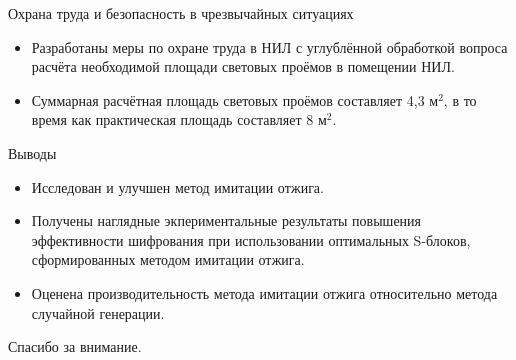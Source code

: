 \documentclass[12pt,unicode]{beamer}
\begin{document}
\begin{frame}{Охрана труда и безопасность в чрезвычайных ситуациях}

    \begin{itemize}

        \item Разработаны меры по охране труда в НИЛ с углублённой обработкой вопроса расчёта необходимой площади световых проёмов в помещении НИЛ.
        
        \item Суммарная расчётная площадь световых проёмов составляет 4,3 $\text{м}^2$, в то время как практическая площадь составляет 8 $\text{м}^2$.

    \end{itemize}

\end{frame} 


\begin{frame}{Выводы}

    \begin{itemize}

        \item Исследован и улучшен метод имитации отжига.

        \item Получены наглядные экпериментальные результаты повышения эффективности шифрования при использовании оптимальных S-блоков, сформированных методом имитации отжига.

        \item Оценена производительность метода имитации отжига относительно метода случайной генерации.

    \end{itemize}

\end{frame} 


\begin{frame}{}

    \begin{center}
        \LARGE{Спасибо за внимание.}
    \end{center}

\end{frame}
\end{document}
